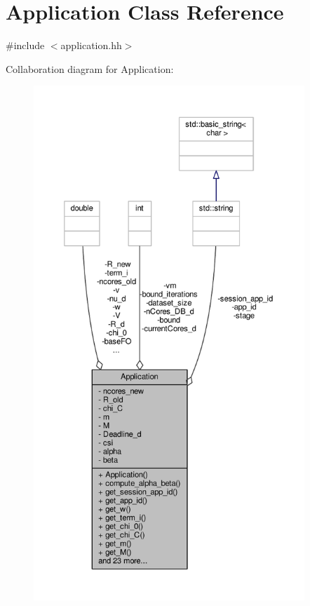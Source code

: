 \hypertarget{classApplication}{\section{Application Class Reference}
\label{classApplication}
}


{\ttfamily \#include $<$application.\-hh$>$}



Collaboration diagram for Application\-:
\nopagebreak
\begin{figure}[H]
\begin{center}
\leavevmode
\includegraphics[height=550pt]{classApplication__coll__graph}
\end{center}
\end{figure}
